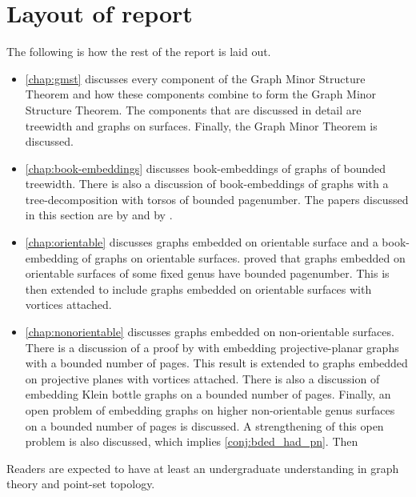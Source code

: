 \section{Layout of report}
The following is how the rest of the report is laid out. 
\begin{itemize}
	\item \cref{chap:gmst} discusses every component of the Graph Minor Structure Theorem and how these components combine to form the Graph Minor Structure Theorem. The components that are discussed in detail are treewidth and graphs on surfaces. Finally, the Graph Minor Theorem is discussed.
	\item \cref{chap:book-embeddings} discusses book-embeddings of graphs of bounded treewidth. There is also a discussion of book-embeddings of graphs with a tree-decomposition with torsos of bounded pagenumber. The papers discussed in this section are by \textcite{hickingbothamStackNumberCliqueSum2023} and by \textcite{ganleyPagenumberTrees2001}. 
	\item \cref{chap:orientable} discusses graphs embedded on orientable surface and a book-embedding of graphs on orientable surfaces. \textcite{heathPagenumberGenusGraphs1992} proved that graphs embedded on orientable surfaces of some fixed genus have bounded pagenumber. This is then extended to include graphs embedded on orientable surfaces with vortices attached. 
	\item \cref{chap:nonorientable} discusses graphs embedded on non-orientable surfaces. There is a discussion of a proof by \textcite{nakamotoBookEmbeddingProjectiveplanar2015} with embedding projective-planar graphs with a bounded number of pages. This result is extended to graphs embedded on projective planes with vortices attached. There is also a discussion of embedding Klein bottle graphs on a bounded number of pages. Finally, an open problem of embedding graphs on higher non-orientable genus surfaces on a bounded number of pages is discussed. A strengthening of this open problem is also discussed, which implies \cref{conj:bded_had_pn}. Then 
\end{itemize}

Readers are expected to have at least an undergraduate understanding in graph theory and point-set topology. 
